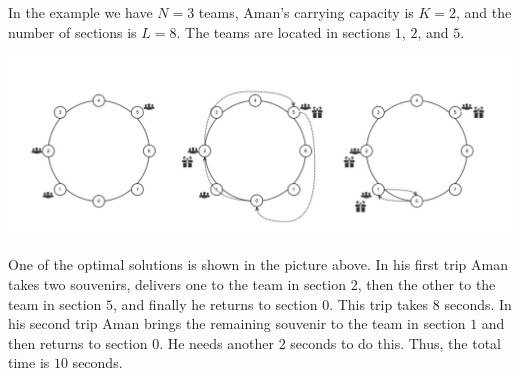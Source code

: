 In the example we have $N = 3$ teams, Aman's carrying capacity is $K = 2$, and the number of sections is $L = 8$. The teams are located in sections $1$, $2$, and $5$.

\includegraphics[scale=0.8]{boxes1.png}

One of the optimal solutions is shown in the picture above. In his first trip Aman takes two souvenirs, delivers one to the team in section $2$, then the other to the team in section $5$, and finally he returns to section $0$. This trip takes $8$ seconds. In his second trip Aman brings the remaining souvenir to the team in section $1$ and then returns to section $0$. He needs another $2$ seconds to do this. Thus, the total time is $10$ seconds.
